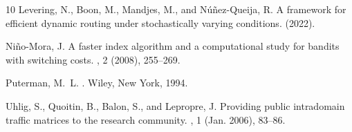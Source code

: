 \documentclass{amsart}
\begin{document}
\begin{thebibliography}{10}
{\sc Levering, N., Boon, M., Mandjes, M., and N{\'u}{\~n}ez-Queija, R.}
\newblock A framework for efficient dynamic routing under stochastically
  varying conditions.
 (2022).

{\sc Ni{\~n}o-Mora, J.}
\newblock A faster index algorithm and a computational study for bandits with
  switching costs.
, 2 (2008), 255--269.

{\sc Puterman, M.~L.}
.
\newblock Wiley, New York, 1994.

{\sc Uhlig, S., Quoitin, B., Balon, S., and Lepropre, J.}
\newblock Providing public intradomain traffic matrices to the research
  community.
, 1 (Jan. 2006),
  83--86.

\end{thebibliography}
\end{document}

